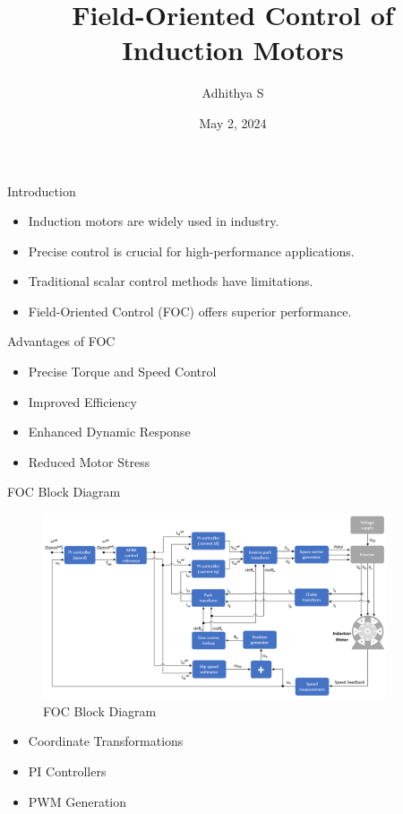 \documentclass{beamer}
\title{Field-Oriented Control of Induction Motors}
\author{Adhithya S}
\institute{REC, Chennai}
\date{May 2, 2024}
\begin{document}
\begin{frame}
  \titlepage
\end{frame}

\begin{frame}{Introduction}
  \begin{itemize}
    \item Induction motors are widely used in industry.
    \item Precise control is crucial for high-performance applications.
    \item Traditional scalar control methods have limitations.
    \item Field-Oriented Control (FOC) offers superior performance.
  \end{itemize}
\end{frame}

\begin{frame}{Advantages of FOC}
  \begin{itemize}
    \item Precise Torque and Speed Control
    \item Improved Efficiency
    \item Enhanced Dynamic Response
    \item Reduced Motor Stress
  \end{itemize}
\end{frame}

\begin{frame}{FOC Block Diagram}
  \begin{figure}
    \includegraphics[width=4in]{conference/blockDiagram.png} %
    \caption{FOC Block Diagram}
  \end{figure}
  \begin{itemize}
    \item Coordinate Transformations
    \item PI Controllers
    \item PWM Generation
  \end{itemize}
\end{frame}
\end{document}
